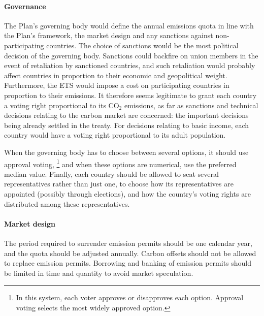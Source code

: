 \documentclass[a5paper,english,openany]{memoir}
\begin{document}
\paragraph{Governance} 
The Plan's governing body would define the annual emissions quota in line with the Plan's framework, %
the market design %
and any sanctions against non-participating countries. %
The choice of sanctions would be the most political decision of the governing body. Sanctions could backfire on union members in the event of retaliation by sanctioned countries, and such retaliation would probably affect countries in proportion to their economic and geopolitical weight. 
Furthermore, the ETS would impose a cost on participating countries in proportion to their emissions. It therefore seems legitimate to grant each country a voting right proportional to its CO$_\text{2}$ emissions, as far as sanctions and technical decisions relating to the carbon market are concerned: the important decisions being already settled in the treaty. %
For decisions relating to basic income, each country would have a voting right proportional to its adult population. 

When the governing body has to choose between several options, it should use approval voting, %
\footnote{In this system, each voter approves or disapproves each option. Approval voting selects the most widely approved option.} and when these options are numerical, use the preferred median value. Finally, each country should be allowed to seat several representatives rather than just one, to choose how its representatives are appointed (possibly through elections), and how the country's voting rights are distributed among these representatives. 


\paragraph{Market design} 
The period required to surrender emission permits should be one calendar year, and the quota should be adjusted annually. Carbon offsets should not be allowed to replace emission permits. Borrowing and banking of emission permits should be limited in time and quantity to avoid market speculation. %
\end{document}
